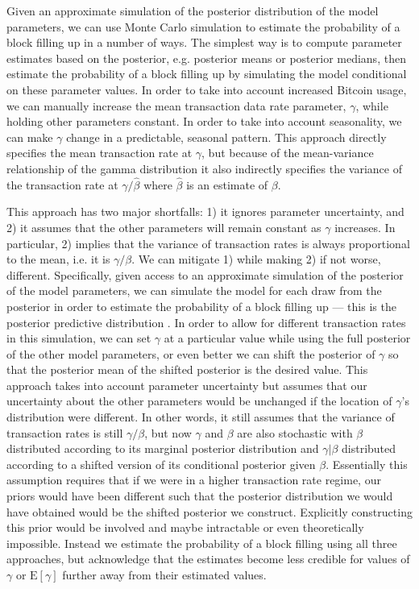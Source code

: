 \documentclass{article}
\begin{document}
Given an approximate simulation of the posterior distribution of the model parameters, we can use Monte Carlo simulation to estimate the probability of a block filling up in a number of ways. The simplest way is to compute parameter estimates based on the posterior, e.g. posterior means or posterior medians, then estimate the probability of a block filling up by simulating the model conditional on these parameter values. In order to take into account increased Bitcoin usage, we can manually increase the mean transaction data rate parameter, $\gamma$, while holding other parameters constant. In order to take into account seasonality, we can make $\gamma$ change in a predictable, seasonal pattern. This approach directly specifies the mean transaction rate at $\gamma$, but because of the mean-variance relationship of the gamma distribution it also indirectly specifies the variance of the transaction rate at $\gamma/\hat{\beta}$ where $\hat{\beta}$ is an estimate of $\beta$.

This approach has two major shortfalls: 1) it ignores parameter uncertainty, and 2) it assumes that the other parameters will remain constant as $\gamma$ increases. In particular, 2) implies that the variance of transaction rates is always proportional to the mean, i.e. it is $\gamma/\beta$. We can mitigate 1) while making 2) if not worse, different. Specifically, given access to an approximate simulation of the posterior of the model parameters, we can simulate the model for each draw from the posterior in order to estimate the probability of a block filling up --- this is the posterior predictive distribution \citep{gelman2014bayesian}. In order to allow for different transaction rates in this simulation, we can set $\gamma$ at a particular value while using the full posterior of the other model parameters, or even better we can shift the posterior of $\gamma$ so that the posterior mean of the shifted posterior is the desired value. This approach takes into account parameter uncertainty but assumes that our uncertainty about the other parameters would be unchanged if the location of $\gamma$'s distribution were different. In other words, it still assumes that the variance of transaction rates is still $\gamma/\beta$, but now $\gamma$ and $\beta$ are also stochastic with $\beta$ distributed according to its marginal posterior distribution and $\gamma|\beta$ distributed according to a shifted version of its conditional posterior given $\beta$. Essentially this assumption requires that if we were in a higher transaction rate regime, our priors would have been different such that the posterior distribution we would have obtained would be the shifted posterior we construct. Explicitly constructing this prior would be involved and maybe intractable or even theoretically impossible. Instead we estimate the probability of a block filling using all three approaches, but acknowledge that the estimates become less credible for values of $\gamma$ or $\mathrm{E}[\gamma]$ further away from their estimated values.
\end{document}

